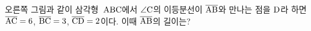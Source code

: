 \noindent\begin{minipage}[t]{0.58\linewidth}\vspace{0pt}\raggedright 오른쪽 그림과 같이 삼각형~$\mathrm{ABC}$에서 $\angle\mathrm{C}$의 이등분선이 $\overline{\mathrm{AB}}$와 만나는 점을 $\mathrm{D}$라 하면 $\overline{\mathrm{AC}}=6$, $\overline{\mathrm{BC}}=3$, $\overline{\mathrm{CD}}=2$이다. 이때 $\overline{\mathrm{AB}}$의 길이는?\end{minipage}\hfill\begin{minipage}[t]{0.4\linewidth}\vspace{0pt}\centering \resizebox{\ifdim\width>\linewidth\linewidth\else\width\fi}{!}{}\end{minipage}\par
{}
